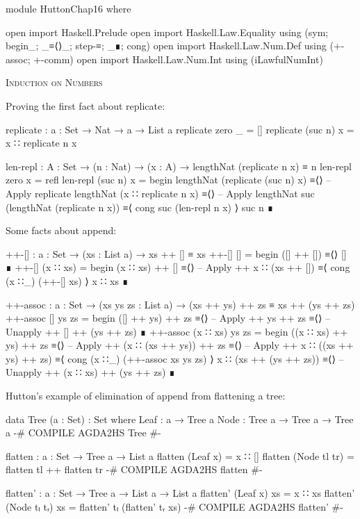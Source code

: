 \documentclass{article}
\begin{document}
\begin{code}
module HuttonChap16 where

open import Haskell.Prelude
open import Haskell.Law.Equality using (sym; begin_; _≡⟨⟩_; step-≡; _∎; cong)
open import Haskell.Law.Num.Def using (+-assoc; +-comm)
open import Haskell.Law.Num.Int using (iLawfulNumInt)
\end{code}

\noindent
\textsc{Induction on Numbers}

\noindent
Proving the first fact about replicate:

\begin{code}
replicate : {a : Set} → Nat → a → List a
replicate zero _ = []
replicate (suc n) x = x ∷ replicate n x

len-repl : {A : Set} → (n : Nat) → (x : A) → lengthNat (replicate n x) ≡ n
len-repl zero x = refl
len-repl (suc n) x =
  begin
    lengthNat (replicate (suc n) x)
  ≡⟨⟩ -- Apply replicate
    lengthNat (x ∷ replicate n x)
  ≡⟨⟩ -- Apply lengthNat
    suc (lengthNat (replicate n x))
  ≡⟨ cong suc (len-repl n x) ⟩
    suc n
  ∎
\end{code}

\noindent
Some facts about append:

\begin{code}
++-[] : {a : Set} → (xs : List a) → xs ++ [] ≡ xs
++-[] [] = begin ([] ++ []) ≡⟨⟩ [] ∎
++-[] (x ∷ xs) =
    begin
      (x ∷ xs) ++ []
    ≡⟨⟩ -- Apply ++
      x ∷ (xs ++ [])
    ≡⟨ cong (x ∷_) (++-[] xs) ⟩
      x ∷ xs
    ∎
\end{code}

\begin{code}
++-assoc : {a : Set} → (xs ys zs : List a)
    → (xs ++ ys) ++ zs ≡ xs ++ (ys ++ zs)
++-assoc [] ys zs =
    begin
      ([] ++ ys) ++ zs
    ≡⟨⟩ -- Apply ++
      ys ++ zs
    ≡⟨⟩ -- Unapply ++
      [] ++ (ys ++ zs)
    ∎
++-assoc (x ∷ xs) ys zs =
    begin
      ((x ∷ xs) ++ ys) ++ zs
    ≡⟨⟩ -- Apply ++
      (x ∷ (xs ++ ys)) ++ zs
    ≡⟨⟩ -- Apply ++
      x ∷ ((xs ++ ys) ++ zs)
    ≡⟨ cong (x ∷_) (++-assoc xs ys zs) ⟩
      x ∷ (xs ++ (ys ++ zs))
    ≡⟨⟩ -- Unapply ++
      (x ∷ xs) ++ (ys ++ zs)
    ∎
\end{code}

\noindent Hutton's example of elimination of append from flattening a tree:

\begin{code}
data Tree (a : Set) : Set where
    Leaf : a → Tree a
    Node : Tree a → Tree a → Tree a
{-# COMPILE AGDA2HS Tree #-}

flatten : {a : Set} → Tree a → List a
flatten (Leaf x) = x ∷ []
flatten (Node tl tr) = flatten tl ++ flatten tr
{-# COMPILE AGDA2HS flatten #-}

flatten' : {a : Set } → Tree a → List a → List a
flatten' (Leaf x) xs = x ∷ xs
flatten' (Node tₗ tᵣ) xs = flatten' tₗ (flatten' tᵣ xs)
{-# COMPILE AGDA2HS flatten' #-}
\end{code}
\end{document}
